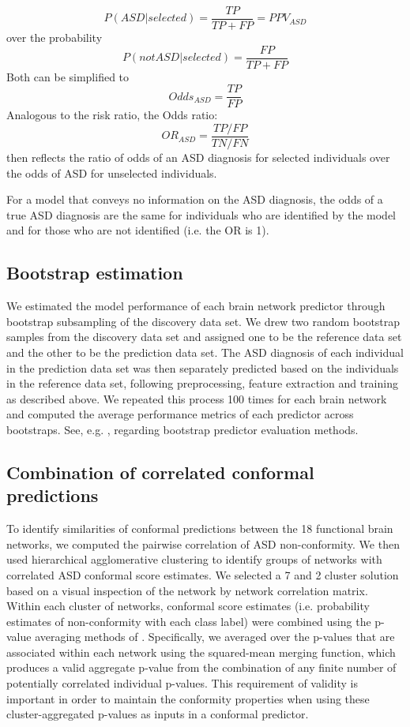 \documentclass[9pt,lineno]{elife}
\begin{document}
\[P(ASD|selected) = \frac{TP}{TP+FP}=PPV_{ASD}\]
over the probability
\[P(not ASD|selected) = \frac{FP}{TP+FP}\]
Both can be simplified to
\[Odds_{ASD} = \frac{TP}{FP}\]
Analogous to the risk ratio, the Odds ratio:
\[OR_{ASD} = \frac{TP/FP}{TN/FN}\]
then reflects the ratio of odds of an ASD diagnosis for selected individuals over the odds of ASD for unselected individuals. 

For a model that conveys no information on the ASD diagnosis, the odds of a true ASD diagnosis are the same for individuals who are identified by the model and for those who are not identified (i.e. the OR is 1). 

\subsection{Bootstrap estimation}
We estimated the model performance of each brain network predictor through bootstrap subsampling of the discovery data set. We drew two random bootstrap samples from the discovery data set and assigned one to be the reference data set and the other to be the prediction data set. The ASD diagnosis of each individual in the prediction data set was then separately predicted based on the individuals in the reference data set, following preprocessing, feature extraction and training as described above. We repeated this process 100 times for each brain network and computed the average performance metrics of each predictor across bootstraps. See, e.g. \citep{Efron1983-ft}, regarding bootstrap predictor evaluation methods.


\subsection{Combination of correlated conformal predictions}
To identify similarities of conformal predictions between the 18 functional brain networks, we computed the pairwise correlation of ASD non-conformity. We then used hierarchical agglomerative clustering to identify groups of networks with correlated ASD conformal score estimates. We selected a 7 and 2 cluster solution based on a visual inspection of the network by network correlation matrix.
Within each cluster of networks, conformal score estimates (i.e. probability estimates of non-conformity with each class label) were combined using the p-value averaging methods of \citep{Vovk2012-of}. Specifically, we averaged over the p-values that are associated within each network using the squared-mean merging function, which produces a valid aggregate p-value from the combination of any finite number of potentially correlated individual p-values. This requirement of validity is important in order to maintain the conformity properties when using these cluster-aggregated p-values as inputs in a conformal predictor.
\end{document}
